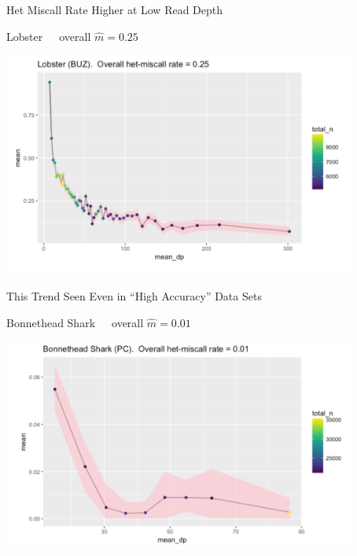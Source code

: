 \documentclass[letter,graphicx]{beamer}
\begin{document}
\begin{frame}{Het Miscall Rate Higher at Low Read Depth}

\begin{center}
Lobster~~~overall $\hat{m} = 0.25$
\vspace*{1.5em}

\includegraphics[width=0.87\textwidth]{./images/lobster-dp.png}
\end{center}
\end{frame}




\begin{frame}{This Trend Seen Even in ``High Accuracy'' Data Sets}

\begin{center}
Bonnethead Shark~~~overall $\hat{m} = 0.01$
\vspace*{1.5em}

\includegraphics[width=0.87\textwidth]{./images/bonnethead-shark-dp.png}
\end{center}
\end{frame}
\end{document}
